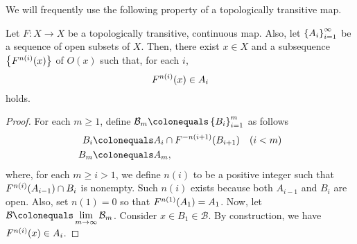 \documentclass[10pt,draft,twoside]{book}
\begin{document}
We will frequently use the following property of a topologically transitive map.
\begin{proposition}
  Let $F: X \to X$ be a topologically transitive, continuous map.
  Also, let $\left \{ A_i \right \}^{\infty}_{i=1}$ be a sequence of open subsets of $X$.
  Then, there exist $x \in X$ and a subsequence $\left \{ F^{n(i)}(x) \right \}$ of $O(x)$ such that, for each $i$,
  \begin{equation*}
    F^{n(i)}(x) \in A_i
  \end{equation*}
  holds.
  \label{prop:transitivity}
  \begin{proof}
    For each $m \geq 1$, define $\mathcal{B}_m \ceq \seq{B_i}{m}{i=1}$ as follows
    \begin{align*}
      B_i &\ceq A_{i} \cap \itr{F}{-n(i+1)} (B_{i+1}) \quad (i < m) \\
      B_m &\ceq A_m,
    \end{align*}
    where, for each $m \geq i > 1$, we define $n(i)$ to be a positive integer such that $F^{n(i)}(A_{i-1}) \cap B_i$ is nonempty.
    Such $n(i)$ exists because both $A_{i-1}$ and $B_i$ are open.
    Also, set $n(1) = 0$ so that $F^{n(1)}(A_1) = A_1$.
    Now, let $\mathcal{B} \ceq \lim\limits_{m \to \infty} \mathcal{B}_m$.
    Consider $x \in B_1 \in \mathcal{B}$.
    By construction, we have $F^{n(i)}(x) \in A_i$.
  \end{proof}
\end{proposition}
\end{document}
